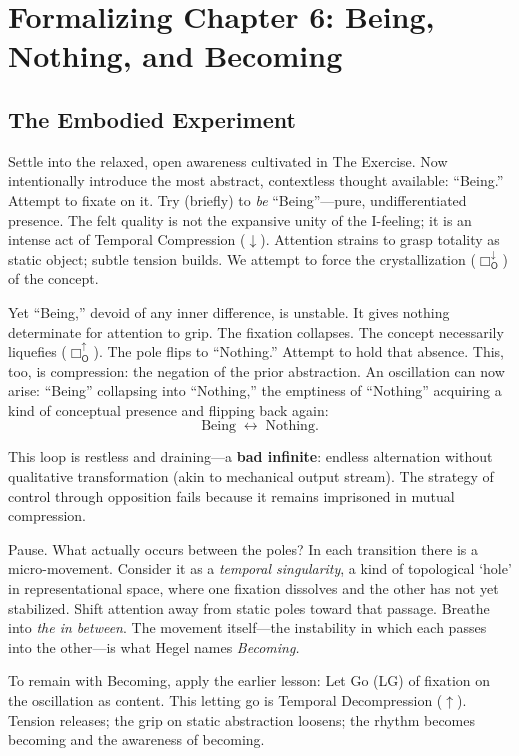 \documentclass[12pt]{book}
\newcommand{\OBoxUp}{\Box_{\mathsf{O}}^{\uparrow}}
\newcommand{\OBoxDown}{\Box_{\mathsf{O}}^{\downarrow}}
\begin{document}
\section{Formalizing Chapter 6: Being, Nothing, and Becoming}

\subsection{The Embodied Experiment}

Settle into the relaxed, open awareness cultivated in The Exercise. Now intentionally introduce the most abstract, contextless thought available: ``Being.'' Attempt to fixate on it. Try (briefly) to \textit{be} ``Being''---pure, undifferentiated presence. The felt quality is not the expansive unity of the I-feeling; it is an intense act of Temporal Compression ($\downarrow$). Attention strains to grasp totality as static object; subtle tension builds. We attempt to force the crystallization ($\OBoxDown$) of the concept.

Yet ``Being,'' devoid of any inner difference, is unstable. It gives nothing determinate for attention to grip. The fixation collapses. The concept necessarily liquefies ($\OBoxUp$). The pole flips to ``Nothing.'' Attempt to hold that absence. This, too, is compression: the negation of the prior abstraction. An oscillation can now arise: ``Being'' collapsing into ``Nothing,'' the emptiness of ``Nothing'' acquiring a kind of conceptual presence and flipping back again:
\[
    	\text{Being} \; \longleftrightarrow \; \text{Nothing}.
\]

This loop is restless and draining---a \textbf{bad infinite}: endless alternation without qualitative transformation (akin to mechanical output stream). The strategy of control through opposition fails because it remains imprisoned in mutual compression.

Pause. What actually occurs between the poles? In each transition there is a micro-movement. Consider it as a \textit{temporal singularity}, a kind of topological `hole' in representational space, where one fixation dissolves and the other has not yet stabilized. Shift attention away from static poles toward that passage. Breathe into \textit{the in between}. The movement itself---the instability in which each passes into the other---is what Hegel names \textit{Becoming.}

To remain with Becoming, apply the earlier lesson: Let Go (LG) of fixation on the oscillation as content. This letting go is Temporal Decompression ($\uparrow$). Tension releases; the grip on static abstraction loosens; the rhythm becomes becoming and the awareness of becoming.
\end{document}
